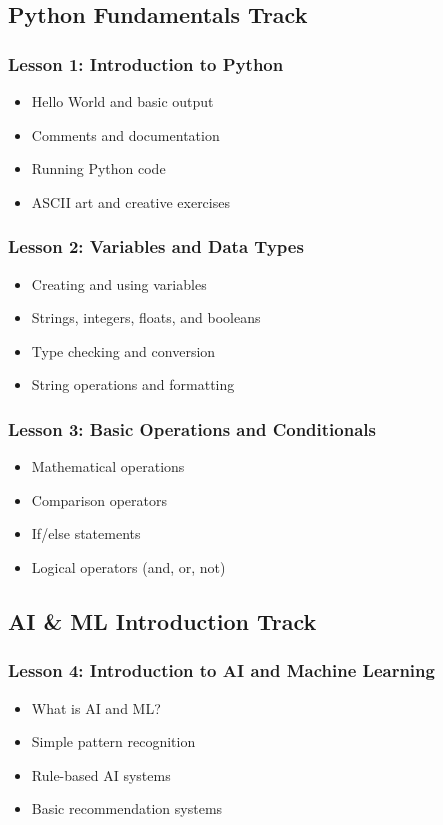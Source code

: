 \documentclass[11pt,letterpaper]{article}
\begin{document}
\subsection{Python Fundamentals Track}

\subsubsection{Lesson 1: Introduction to Python}
\begin{itemize}[leftmargin=*]
    \item Hello World and basic output
    \item Comments and documentation
    \item Running Python code
    \item ASCII art and creative exercises
\end{itemize}

\subsubsection{Lesson 2: Variables and Data Types}
\begin{itemize}[leftmargin=*]
    \item Creating and using variables
    \item Strings, integers, floats, and booleans
    \item Type checking and conversion
    \item String operations and formatting
\end{itemize}

\subsubsection{Lesson 3: Basic Operations and Conditionals}
\begin{itemize}[leftmargin=*]
    \item Mathematical operations
    \item Comparison operators
    \item If/else statements
    \item Logical operators (and, or, not)
\end{itemize}

\subsection{AI \& ML Introduction Track}

\subsubsection{Lesson 4: Introduction to AI and Machine Learning}
\begin{itemize}[leftmargin=*]
    \item What is AI and ML?
    \item Simple pattern recognition
    \item Rule-based AI systems
    \item Basic recommendation systems
\end{itemize}
\end{document}
